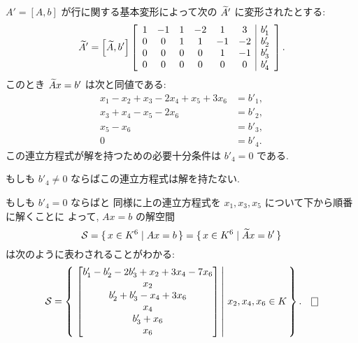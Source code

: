 \documentclass[12pt,twoside]{jarticle}
\begin{document}
\begin{example}
  \label{example:sol-inhom-lin-eq}
  $A'=[A,b]$ が行に関する基本変形によって次の ${\widetilde A}'$ に変形されたとする:
  \begin{equation*}
    {\widetilde A}' = \left[{\widetilde A},b'\right]
    \left[
      \begin{array}{cccccc|c}
        1 & -1 & 1 & -2 &  1 &  3 & b'_1 \\
        0 &  0 & 1 &  1 & -1 & -2 & b'_2 \\
        0 &  0 & 0 &  0 &  1 & -1 & b'_3 \\
        0 &  0 & 0 &  0 &  0 &  0 & b'_4 \\
      \end{array}
    \right].
  \end{equation*}
  このとき ${\widetilde A} x=b'$ は次と同値である:
  \begin{align*}
    x_1 - x_2 + x_3 - 2x_4 +  x_5 + 3x_6 &= b'_1, \\
                x_3 +  x_4 -  x_5 - 2x_6 &= b'_2, \\
                              x_5 -  x_6 &= b'_3, \\
                                       0 &= b'_4.
  \end{align*}
  この連立方程式が解を持つための必要十分条件は $b'_4=0$ である.

  もしも $b'_4\ne 0$ ならばこの連立方程式は解を持たない.

  もしも $b'_4=0$ ならばと
  同様に上の連立方程式を $x_1,x_3,x_5$ について下から順番に解くことに
  よって, $Ax=b$ の解空間
  \begin{equation*}
    {\mathcal S} = \{\,x\in K^6 \mid Ax=b \,\} = \{\,x\in K^6 \mid {\widetilde A} x=b' \,\}
  \end{equation*}
  は次のように表わされることがわかる:
  \begin{equation*}
    \cS = 
    \left\{\,
      \left.
        \begin{bmatrix}
          b'_1 - b'_2 - 2b'_3 + x_2 + 3x_4 - 7x_6 \\
                                x_2               \\
                 b'_2 + b'_3        -  x_4 + 3x_6 \\
                                       x_4        \\
                        b'_3               +  x_6 \\
                                              x_6 \\
        \end{bmatrix}
      \,\right|\,
      x_2,x_4,x_6\in K
    \,\right\}.
    \qed
  \end{equation*}
\end{example}
\end{document}

